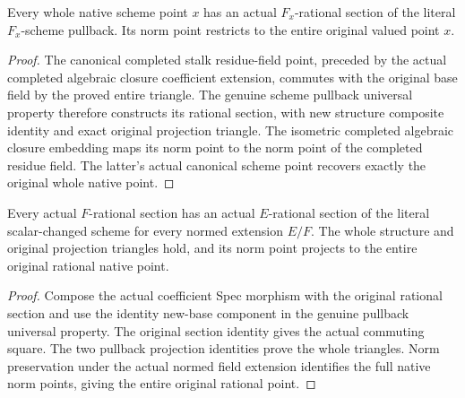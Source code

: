 \begin{lemma}
\label{lem:fc-scheme-rational-point-lift}
\leanok
{}
Every whole native scheme point $x$ has an actual $F_x$-rational section
of the literal $F_x$-scheme pullback. Its norm point restricts to the
entire original valued point $x$.
\end{lemma}
\begin{proof}
The canonical completed stalk residue-field point, preceded by the
actual completed algebraic closure coefficient extension, commutes with
the original base field by the proved entire triangle. The genuine
scheme pullback universal property therefore constructs its rational
section, with new structure composite identity and exact original
projection triangle. The isometric completed algebraic closure
embedding maps its norm point to the norm point of the completed
residue field. The latter's actual canonical scheme point recovers
exactly the original whole native point.
\end{proof}

\begin{lemma}
\label{lem:fc-scheme-rational-section-base-change}
\leanok
{}
Every actual $F$-rational section has an actual $E$-rational section of
the literal scalar-changed scheme for every normed extension $E/F$.
The whole structure and original projection triangles hold, and its
norm point projects to the entire original rational native point.
\end{lemma}
\begin{proof}
Compose the actual coefficient Spec morphism with the original rational
section and use the identity new-base component in the genuine
pullback universal property. The original section identity gives the
actual commuting square. The two pullback projection identities prove
the whole triangles. Norm preservation under the actual normed field
extension identifies the full native norm points, giving the entire
original rational point.
\end{proof}
